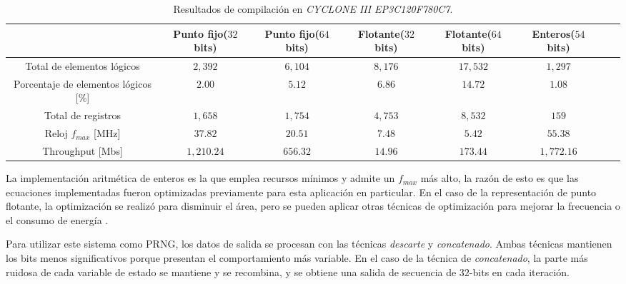 \begin{table*} [tb]
\begin{center}
\caption{Resultados de compilación en \textit{CYCLONE III EP3C120F780C7}.}
\begin{tabular}{|c|c|c|c|c|c|c|c|}
	\hline\hline
	                                     & Punto fijo($32$bits) & Punto fijo($64$bits) & Flotante($32$bits) & Flotante($64$bits) & Enteros($54$bits) &  \\ \hline\hline
	     Total de elementos lógicos      &       $2,392$        &       $6,104$        &      $8,176$       &      $17,532$      &      $1,297$      &  \\ \hline
	Porcentaje de elementos lógicos [\%] &        $2.00$        &        $5.12$        &       $6.86$       &      $14.72$       &      $1.08$       &  \\ \hline
	         Total de registros          &       $1,658$        &       $1,754$        &      $4,753$       &      $8,532 $      &       $159$       &  \\ \hline\hline
	       Reloj $f_{max}$ [MHz]         &       $37.82$        &       $20.51$        &       $7.48$       &       $5.42$       &      $55.38$      &  \\ \hline
	          Throughput [Mbs]           &      $1,210.24$      &       $656.32$       &      $14.96$       &      $173.44$      &    $1,772.16$     &  \\ \hline\hline
\end{tabular}
\end{center}
\label{tabla:Tabla1}
\end{table*}

La implementación aritmética de enteros es la que emplea recursos mínimos y admite un $f_{max}$ más alto, la razón de esto es que las ecuaciones implementadas fueron optimizadas previamente para esta aplicación en particular.
En el caso de la representación de punto flotante, la optimización se realizó para disminuir el área, pero se pueden aplicar otras técnicas de optimización para mejorar la frecuencia o el consumo de energía \cite{Giri2012, Gokul2004}.

Para utilizar este sistema como PRNG, los datos de salida se procesan con las técnicas \textit{descarte} y \textit{concatenado}.
Ambas técnicas mantienen los bits menos significativos porque presentan el comportamiento más variable.
En el caso de la técnica de \textit{concatenado}, la parte más ruidosa de cada variable de estado se mantiene y se recombina, y se obtiene una salida de secuencia de $32$-bits en cada iteración.

